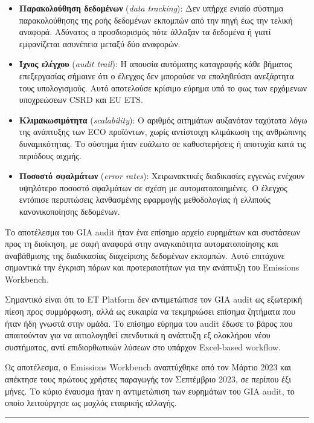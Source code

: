 \begin{itemize}
\tightlist
\item
  \textbf{Παρακολούθηση δεδομένων} (\emph{data tracking}): Δεν υπήρχε
  ενιαίο σύστημα παρακολούθησης της ροής δεδομένων εκπομπών από την πηγή
  έως την τελική αναφορά. Αδύνατος ο προσδιορισμός πότε άλλαξαν τα
  δεδομένα ή γιατί εμφανίζεται ασυνέπεια μεταξύ δύο αναφορών.
\item
  \textbf{Ίχνος ελέγχου} (\emph{audit trail}): Η απουσία αυτόματης
  καταγραφής κάθε βήματος επεξεργασίας σήμαινε ότι ο έλεγχος δεν
  μπορούσε να επαληθεύσει ανεξάρτητα τους υπολογισμούς. Αυτό αποτελούσε
  κρίσιμο εύρημα υπό το φως των ερχόμενων υποχρεώσεων CSRD και EU ETS.
\item
  \textbf{Κλιμακωσιμότητα} (\emph{scalability}): Ο αριθμός αιτημάτων
  αυξανόταν ταχύτατα λόγω της ανάπτυξης των ECO προϊόντων, χωρίς
  αντίστοιχη κλιμάκωση της ανθρώπινης δυναμικότητας. Το σύστημα ήταν
  ευάλωτο σε καθυστερήσεις ή αποτυχία κατά τις περιόδους αιχμής.
\item
  \textbf{Ποσοστό σφαλμάτων} (\emph{error rates}): Χειρωνακτικές
  διαδικασίες εγγενώς ενέχουν υψηλότερο ποσοστό σφαλμάτων σε σχέση με
  αυτοματοποιημένες. Ο έλεγχος εντόπισε περιπτώσεις λανθασμένης
  εφαρμογής μεθοδολογίας ή ελλιπούς κανονικοποίησης δεδομένων.
\end{itemize}

Το αποτέλεσμα του GIA audit ήταν ένα επίσημο αρχείο ευρημάτων και
συστάσεων προς τη διοίκηση, με σαφή αναφορά στην αναγκαιότητα
αυτοματοποίησης και αναβάθμισης της διαδικασίας διαχείρισης δεδομένων
εκπομπών. Αυτό επιτάχυνε σημαντικά την έγκριση πόρων και προτεραιοτήτων
για την ανάπτυξη του Emissions Workbench.

Σημαντικό είναι ότι το ET Platform δεν αντιμετώπισε τον GIA audit ως
εξωτερική πίεση προς συμμόρφωση, αλλά ως ευκαιρία να τεκμηριώσει επίσημα
ζητήματα που ήταν ήδη γνωστά στην ομάδα. Το επίσημο εύρημα του audit
έδωσε το βάρος που απαιτούνταν για να αιτιολογηθεί επενδυτικά η ανάπτυξη
εξ ολοκλήρου νέου συστήματος, αντί επιδιορθωτικών λύσεων στο υπάρχον
Excel-based workflow.

Ως αποτέλεσμα, ο Emissions Workbench αναπτύχθηκε από τον Μάρτιο 2023 και
απέκτησε τους πρώτους χρήστες παραγωγής τον Σεπτέμβριο 2023, σε περίπου
έξι μήνες. Το κύριο έναυσμα ήταν η αντιμετώπιση των ευρημάτων του GIA
audit, το οποίο λειτούργησε ως μοχλός εταιρικής αλλαγής.

\begin{center}\rule{0.5\linewidth}{0.5pt}\end{center}

